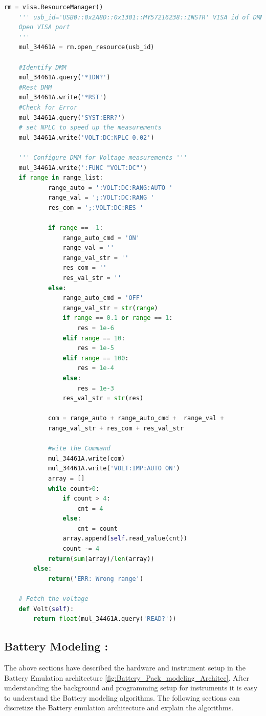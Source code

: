 \begin{lstlisting}[language=Python, caption=DMM Keysight 34401A's Meauring/Configuration ]
    rm = visa.ResourceManager()
    ''' usb_id='USB0::0x2A8D::0x1301::MY57216238::INSTR' VISA id of DMM 
    Open VISA port
    '''
    mul_34461A = rm.open_resource(usb_id)

    #Identify DMM
    mul_34461A.query('*IDN?')
    #Rest DMM
    mul_34461A.write('*RST')
    #Check for Error
    mul_34461A.query('SYST:ERR?')  
    # set NPLC to speed up the measurements
    mul_34461A.write('VOLT:DC:NPLC 0.02')  

    ''' Configure DMM for Voltage measurements '''
    mul_34461A.write(':FUNC "VOLT:DC"') 
    if range in range_list:
            range_auto = ':VOLT:DC:RANG:AUTO '
            range_val = ';:VOLT:DC:RANG '
            res_com = ';:VOLT:DC:RES '

            if range == -1:
                range_auto_cmd = 'ON'
                range_val = ''
                range_val_str = ''
                res_com = ''
                res_val_str = ''
            else:
                range_auto_cmd = 'OFF'
                range_val_str = str(range)
                if range == 0.1 or range == 1:
                    res = 1e-6
                elif range == 10:
                    res = 1e-5
                elif range == 100:
                    res = 1e-4    
                else:   
                    res = 1e-3
                res_val_str = str(res)

            com = range_auto + range_auto_cmd +  range_val + 
            range_val_str + res_com + res_val_str

            #wite the Command
            mul_34461A.write(com) 
            mul_34461A.write('VOLT:IMP:AUTO ON')
            array = []
            while count>0:
                if count > 4:
                    cnt = 4
                else:
                    cnt = count 
                array.append(self.read_value(cnt))
                count -= 4 
            return(sum(array)/len(array))   
        else:
            return('ERR: Wrong range')   

    # Fetch the voltage 
    def Volt(self):
        return float(mul_34461A.query('READ?')) 
\end{lstlisting}

\subsection{ Battery Modeling :}
The above sections have described the hardware and instrument setup in the Battery Emulation architecture \ref{fig:Battery_Pack_modeling_Architec}. After understanding the background and programming setup for instruments it is easy to understand the Battery modeling algorithms. The following sections can discretize the Battery emulation architecture and explain the algorithms.

